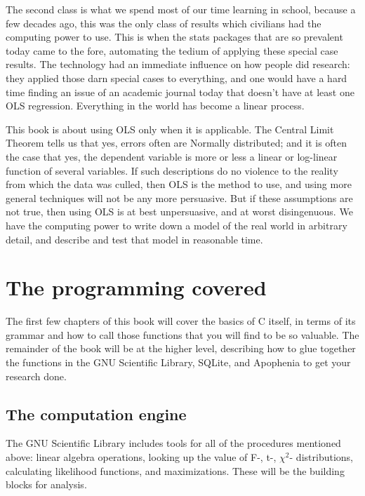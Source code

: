 \documentclass[12pt,notitlepage, openany]{book}
\def\ind#1{\index{#1}#1}
\begin{document}
\begin{multicols}{2}
The second class is what we spend most of our time learning in school,
because a few decades ago, this was the only class of results which
civilians had the computing power to use. This is when the stats packages
that are so prevalent today came to the fore, automating the tedium of
applying these special case results. The technology had an immediate
influence on how people did research: they applied those darn special
cases to everything, and one would have a hard time finding an issue of an
academic journal today that doesn't have at least one OLS regression.
Everything in the world has become a linear process.

This book is about using OLS only when it is applicable. 
The Central Limit Theorem tells us that yes, errors often are
Normally distributed; and it is often the case that yes, the dependent
variable is more or less a linear or log-linear function of several
variables. If such descriptions do no violence to the reality from
which the data was culled, then OLS is the method to use, and using
more general techniques will not be any more persuasive. But if these
assumptions are not true, then using OLS is at best unpersuasive, and at
worst disingenuous. We have the computing power to write down a model of
the real world in arbitrary detail, and describe and test that model in
reasonable time.

\section{The programming covered}

The first few chapters of this book will cover the basics of C itself,
in terms of its grammar and how to call those functions that you will
find to be so valuable. The remainder of the book will be at the higher
level, describing how to glue together the functions in the GNU Scientific
Library, SQLite, and Apophenia to get your research done.

\subsection{The computation engine} The \ind{GNU Scientific Library}
includes tools for all of the procedures mentioned above: linear algebra
operations, looking up the value of F-, t-, $\chi^2$- distributions,
calculating likelihood functions, and maximizations. These will be the
building blocks for analysis.


\end{multicols}
\end{document}
